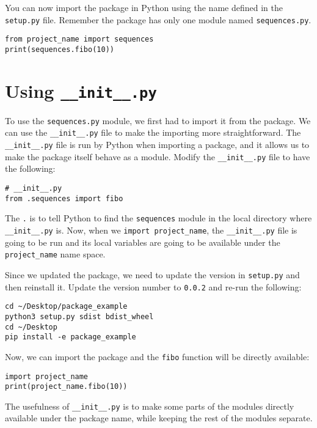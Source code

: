 \documentclass[12pt, a4paper]{article}
\begin{document}
You can now import the package in Python using the name defined in the \texttt{setup.py} file. Remember the package has only one module named \texttt{sequences.py}.
\lstset{language=jupyter-python,label= ,caption= ,captionpos=b,numbers=none}
\begin{lstlisting}
from project_name import sequences
print(sequences.fibo(10))
\end{lstlisting}
\section*{Using \texttt{\_\_init\_\_.py}}
\label{sec:org3c31919}
To use the \texttt{sequences.py} module, we first had to import it from the package.
We can use the \texttt{\_\_init\_\_.py} file to make the importing more straightforward.
The \texttt{\_\_init\_\_.py} file is run by Python when importing a package, and it allows us to make the package itself behave as a module.
Modify the \texttt{\_\_init\_\_.py} file to have the following:
\lstset{language=jupyter-python,label= ,caption= ,captionpos=b,numbers=none}
\begin{lstlisting}
# __init__.py
from .sequences import fibo
\end{lstlisting}
The \texttt{.} is to tell Python to find the \texttt{sequences} module in the local directory where \texttt{\_\_init\_\_.py} is.
Now, when we \texttt{import project\_name}, the \texttt{\_\_init\_\_.py} file is going to be run and its local variables are going to be available under the \texttt{project\_name} name space.

Since we updated the package, we need to update the version in \texttt{setup.py} and then reinstall it. Update the version number to \texttt{0.0.2} and re-run the following:
\lstset{language=bash,label= ,caption= ,captionpos=b,numbers=none}
\begin{lstlisting}
cd ~/Desktop/package_example
python3 setup.py sdist bdist_wheel
cd ~/Desktop
pip install -e package_example
\end{lstlisting}
Now, we can import the package and the \texttt{fibo} function will be directly available:
\lstset{language=jupyter-python,label= ,caption= ,captionpos=b,numbers=none}
\begin{lstlisting}
import project_name
print(project_name.fibo(10))
\end{lstlisting}

The usefulness of \texttt{\_\_init\_\_.py} is to make some parts of the modules directly available under the package name, while keeping the rest of the modules separate.
\end{document}
